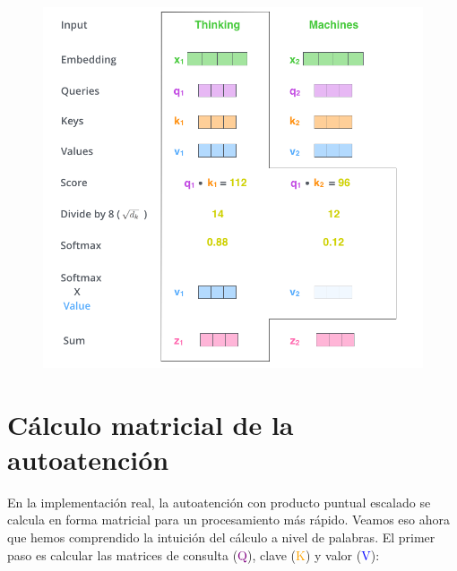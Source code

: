 \begin{figure}[h]
  \centering
  \includegraphics[scale=0.3]{pics/self-attention-output.png}
\end{figure}

\section{Cálculo matricial de la autoatención}
En la implementación real, la autoatención con producto puntual escalado se calcula en forma matricial para un procesamiento más rápido. Veamos eso ahora que hemos comprendido la intuición del cálculo a nivel de palabras. El primer paso es calcular las matrices de consulta (\textcolor{purple}{Q}), clave (\textcolor{orange}{K}) y valor (\textcolor{blue}{V}):

